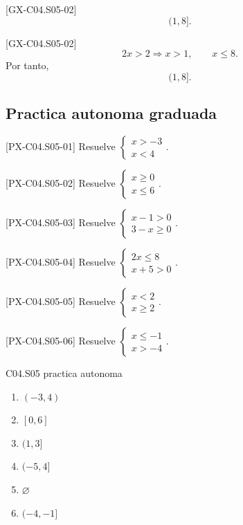 \begin{shortanswer}{[GX-C04.S05-02]}
\[
(1,8].
\]
\end{shortanswer}

\begin{fullsolution}{[GX-C04.S05-02]}
\[
2x>2 \Longrightarrow x>1,
\qquad
x\leq 8.
\]
Por tanto,
\[
(1,8].
\]
\end{fullsolution}

\subsection*{Practica autonoma graduada}
\begin{exercise}{[PX-C04.S05-01] Resuelve \(\begin{cases}x>-3\\ x<4\end{cases}\).}
\end{exercise}
\begin{exercise}{[PX-C04.S05-02] Resuelve \(\begin{cases}x\geq 0\\ x\leq 6\end{cases}\).}
\end{exercise}
\begin{exercise}{[PX-C04.S05-03] Resuelve \(\begin{cases}x-1>0\\ 3-x\geq 0\end{cases}\).}
\end{exercise}
\begin{exercise}{[PX-C04.S05-04] Resuelve \(\begin{cases}2x\leq 8\\ x+5>0\end{cases}\).}
\end{exercise}
\begin{exercise}{[PX-C04.S05-05] Resuelve \(\begin{cases}x<2\\ x\geq 2\end{cases}\).}
\end{exercise}
\begin{exercise}{[PX-C04.S05-06] Resuelve \(\begin{cases}x\leq -1\\ x>-4\end{cases}\).}
\end{exercise}

\begin{shortanswer}{C04.S05 practica autonoma}
\begin{enumerate}[label=\textbf{PX-C04.S05-\arabic*:}, leftmargin=*]
  \item \((-3,4)\)
  \item \([0,6]\)
  \item \((1,3]\)
  \item \((-5,4]\)
  \item \(\varnothing\)
  \item \((-4,-1]\)
\end{enumerate}
\end{shortanswer}


